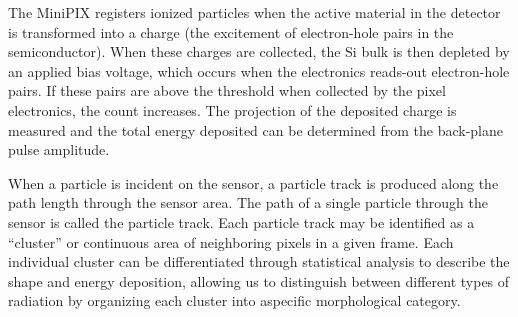 The MiniPIX registers ionized particles when the active material in the detector is transformed into a charge (the excitement of electron-hole pairs in the semiconductor). When these charges are collected, the Si bulk is then depleted by an applied bias voltage, which occurs when the electronics reads-out electron-hole pairs. If these pairs are above the threshold when collected by the pixel electronics, the count increases. The projection of the deposited charge is measured and the total energy deposited can be determined from the back-plane pulse amplitude. 

When a particle is incident on the sensor, a particle track is produced along the path length through the sensor area. The path of a single particle through the sensor is called the particle track.  Each particle track may be identified as a ``cluster'' or continuous area of neighboring pixels in a given frame. Each individual cluster can be differentiated through statistical analysis to describe the shape and energy deposition, allowing us to distinguish between different types of radiation by organizing each cluster into aspecific morphological category. 

